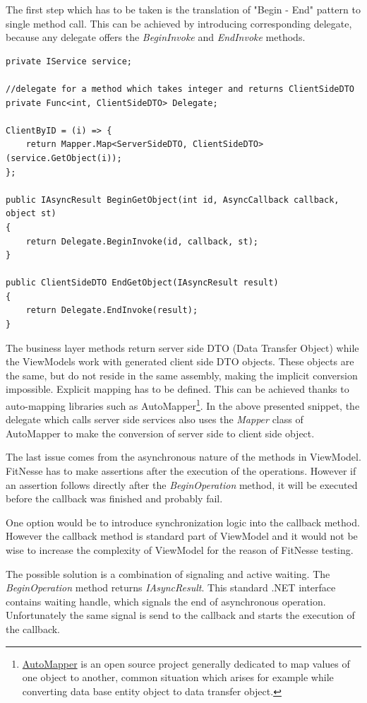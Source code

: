 The first step which has to be taken is the translation of "Begin - End" pattern to single method call. This can be achieved by introducing corresponding delegate, because any delegate offers the \textit{BeginInvoke} and \textit{EndInvoke} methods.

\begin{verbatim}
private IService service;

//delegate for a method which takes integer and returns ClientSideDTO
private Func<int, ClientSideDTO> Delegate;

ClientByID = (i) => {
    return Mapper.Map<ServerSideDTO, ClientSideDTO>(service.GetObject(i));
};
            
public IAsyncResult BeginGetObject(int id, AsyncCallback callback, object st)
{
    return Delegate.BeginInvoke(id, callback, st);
}

public ClientSideDTO EndGetObject(IAsyncResult result)
{
    return Delegate.EndInvoke(result);
}
\end{verbatim}

The business layer methods return server side DTO (Data Transfer Object) while the ViewModels work with generated client side DTO objects. These objects are the same, but do not reside in the same assembly, making the implicit conversion impossible. Explicit mapping has to be defined. This can be achieved thanks to auto-mapping libraries such as AutoMapper\footnote{\href{'http://automapper.codeplex.com/'}{AutoMapper} is an open source project generally dedicated to map values of one object to another, common situation which arises for example while converting data base entity object to data transfer object.}. In the above presented snippet, the delegate which calls server side services also uses the \textit{Mapper} class of AutoMapper to make the conversion of server side to client side object.

The last issue comes from the asynchronous nature of the methods in ViewModel. FitNesse has to make assertions after the execution of the operations. However if an assertion follows directly after the \textit{BeginOperation} method, it will be executed before the callback was finished and probably fail.

One option would be to introduce synchronization logic into the callback method. However the callback method is standard part of ViewModel and it would not be wise to increase the complexity of ViewModel for the reason of FitNesse testing.

The possible solution is a combination of signaling and active waiting. The \textit{BeginOperation} method returns \textit{IAsyncResult}. This standard .NET interface contains waiting handle, which signals the end of asynchronous operation. Unfortunately the same signal is send to the callback and starts the execution of the callback.

